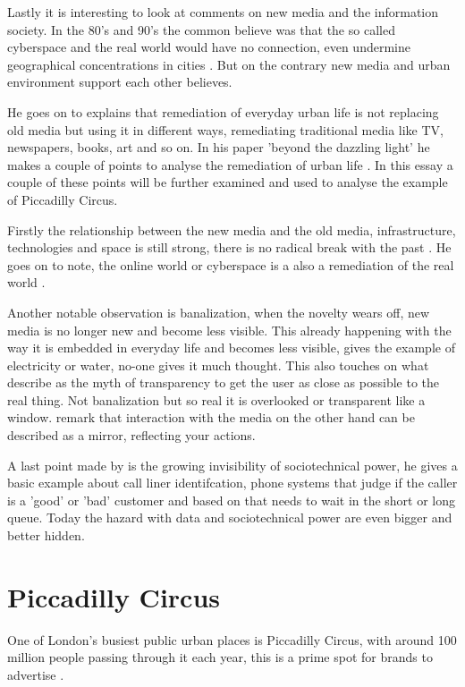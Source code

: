 \documentclass[a4paper, 11pt]{article}
\begin{document}
Lastly it is interesting to look at \cite{Graham} comments on new media and the information society. In the 80's and 90's the common believe was that the so called cyberspace and the real world would have no connection, even undermine geographical concentrations in cities \citep{Graham}. But on the contrary new media and urban environment support each other \cite{Graham} believes. 

He goes on to explains that remediation of everyday urban life is not replacing old media but using it in different ways, remediating traditional media like TV, newspapers, books, art and so on. In his paper 'beyond the dazzling light' he makes a couple of points to analyse the remediation of urban life \citep{Graham}. In this essay a couple of these points will be further examined and used to analyse the example of Piccadilly Circus.

Firstly the relationship between the new media and the old media, infrastructure, technologies and space is still strong, there is no radical break with the past \cite{Graham}. He goes on to note, the online world or cyberspace is a also a remediation of the real world \cite{Graham}.

Another notable observation is banalization, when the novelty wears off, new media is no longer new and become less visible. This already happening with the way it is embedded in everyday life and becomes less visible, \cite{Graham} gives the example of electricity or water, no-one gives it much thought. This also touches on what \cite{bolter2003} describe as the myth of transparency to get the user as close as possible to the real thing. Not banalization but so real it is overlooked or transparent like a window. \cite{bolter2003} remark that interaction with the media on the other hand can be described as a mirror, reflecting your actions.

A last point made by \cite{Graham} is the growing invisibility of sociotechnical power, he gives a basic example about call liner identifcation, phone systems that judge if the caller is a 'good' or 'bad' customer and based on that needs to wait in the short or long queue. Today the hazard with data and sociotechnical power are even bigger and better hidden. 


\section{Piccadilly Circus}


One of London's busiest public urban places is Piccadilly Circus, with around 100 million people passing through it each year, this is a prime spot for brands to advertise \citep{dezeen}.
\end{document}
